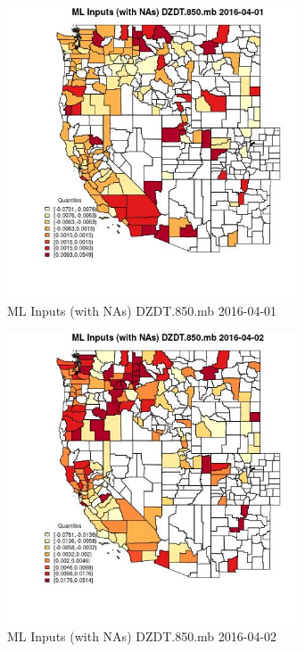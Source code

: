 \begin{figure} 
\centering  
\includegraphics[width=0.77\textwidth]{Code_Outputs/Report_ML_input_PM25_Step4_part_e_de_duplicated_aveswNAs_CountyDZDT850mbMean2016-04-01_2016-04-01.jpg} 
\caption{\label{fig:Report_ML_input_PM25_Step4_part_e_de_duplicated_aveswNAsCountyDZDT850mbMean2016-04-01_2016-04-01}ML Inputs (with NAs) DZDT.850.mb 2016-04-01} 
\end{figure} 
 

\begin{figure} 
\centering  
\includegraphics[width=0.77\textwidth]{Code_Outputs/Report_ML_input_PM25_Step4_part_e_de_duplicated_aveswNAs_CountyDZDT850mbMean2016-04-02_2016-04-02.jpg} 
\caption{\label{fig:Report_ML_input_PM25_Step4_part_e_de_duplicated_aveswNAsCountyDZDT850mbMean2016-04-02_2016-04-02}ML Inputs (with NAs) DZDT.850.mb 2016-04-02} 
\end{figure} 
 

